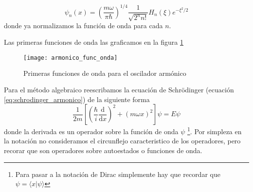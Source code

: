 \begin{equation}
    \psi_n(x) = \left(\frac{m \omega}{\pi \hbar}\right)^{1/4} \frac{1}{\sqrt{2^n n!}} H_n(\xi) e^{-\xi^2/2}
\end{equation}
donde ya normalizamos la función de onda para cada $n$. 

Las primeras funciones de onda las graficamos en la figura \ref{fig:armonico_func_onda}

\begin{figure}[H]
    \centering
    \texttt{[image: armonico\_func\_onda]}
    \caption{Primeras funciones de onda para el oscilador armónico}
    \label{fig:armonico_func_onda}
\end{figure}

Para el método algebraico reescribamos la ecuación de Schrödinger (ecuación \ref{eq:schrodinger_armonico}) de la siguiente forma
\begin{equation}
\frac{1}{2m} \left[\left(\frac{\hbar}{i} \frac{\mathrm{d}}{\mathrm{d}x}\right)^2 + (m \omega x)^2\right]\psi = E\psi
\label{eq:armonico_schrodinger_operador}
\end{equation}
donde la derivada es un operador sobre la función de onda $\psi$ \footnote{Para pasar a la notación de Dirac simplemente hay que recordar que $\psi = \langle x | \psi \rangle$}.
Por simpleza en la notación no consideramos el circunflejo caracteristico de los operadores, pero recorar que son operadores sobre autoestados o funciones de onda.

